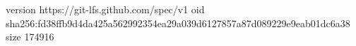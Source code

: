 version https://git-lfs.github.com/spec/v1
oid sha256:fd38ffb9d4da425a562992354ea29a039d6127857a87d089229e9eab01dc6a38
size 174916
